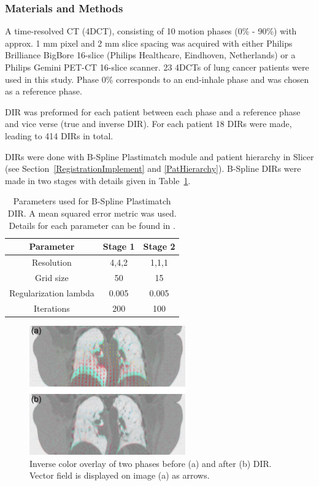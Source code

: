 \documentclass[type=dr, dr=rernat, accentcolor=tud7b,colorbacktitle, bigchapter, openright, twoside, 12pt ]{tudthesis}
\begin{document}
\subsubsection{Materials and Methods}

A time-resolved CT (4DCT), consisting of 10 motion phases (0\% - 90\%) with approx. 1 mm pixel and 2 mm slice spacing was acquired with either Philips Brilliance BigBore 16-slice (Philips Healthcare, Eindhoven, Netherlands) or a Philips Gemini PET-CT 16-slice scanner. 23 4DCTs of lung cancer patients were used in this study.
Phase 0\% corresponds to an end-inhale phase and was chosen as a reference phase.

DIR was preformed for each patient between each phase and a reference phase and vice verse (true and inverse DIR). For each patient 18 DIRs were made, leading to 414 DIRs in total.

DIRs were done with B-Spline Plastimatch module and patient hierarchy in Slicer (see Section~\ref{RegistrationImplement} and \ref{PatHierarchy}). B-Spline DIRs were made in two stages with details given in Table~\ref{tab:stages}. 

\begin{table}[H]
  \centering
  \caption{Parameters used for B-Spline Plastimatch DIR. A mean squared error metric was used. Details for each parameter can be found in \cite{Plastimatch}.}
  \begin{tabular}{c|c|c}
      Parameter & Stage 1 & Stage 2 \\
      \hline
      Resolution & 4,4,2 & 1,1,1 \\
      Grid size & 50 & 15 \\
      Regularization lambda & 0.005 & 0.005 \\
      Iterations & 200 & 100 \\
    \hline\hline
  \end{tabular}
  \label{tab:stages}
\end{table}

\begin{figure}[H]
	\begin{center}		
		\includegraphics[width=0.6\textwidth]{./Images/exampleReg.png}
		\caption{Inverse color overlay of two phases before (a) and after (b) DIR. Vector field is displayed on image (a) as arrows.}
		\label{exampleReg_lung}
	\end{center}
\end{figure}
\end{document}
